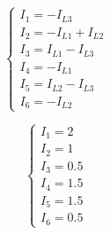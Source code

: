 \begin{equation*}
\left\{\begin{matrix}
I_1 = -I_{L3} \\
I_2 = -I_{L1} + I_{L2} \\
I_3 = I_{L1} - I_{L3} \\
I_4 = -I_{L1} \\
I_5 = I_{L2} - I_{L3} \\
I_6 = -I_{L2}
\end{matrix}\right.
\end{equation*}

\begin{equation*}
\left\{\begin{matrix}
I_1 = 2 \\
I_2 = 1 \\
I_3 = 0.5 \\
I_4 = 1.5 \\
I_5 = 1.5 \\
I_6 = 0.5
\end{matrix}\right.
\end{equation*}
